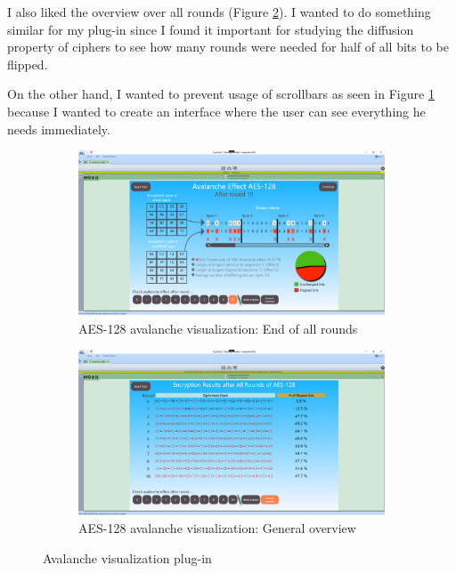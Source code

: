 I also liked the overview over all rounds (Figure \ref{fig:avalanche.overview}). I wanted to do something similar for my plug-in since I found it important for studying the diffusion property of ciphers to see how many rounds were needed for half of all bits to be flipped.

On the other hand, I wanted to prevent usage of scrollbars as seen in Figure \ref{fig:avalanche.roundsend} because I wanted to create an interface where the user can see everything he needs immediately.

\begin{figure}
\centering
\begin{subfigure}{\textwidth}
  \centering
  \includegraphics[width=\textwidth]{figures/ct2/avalanche.png}
  \caption{AES-128 avalanche visualization: End of all rounds}
  \label{fig:avalanche.roundsend}
\end{subfigure}
\begin{subfigure}{\textwidth}
  \centering
  \includegraphics[width=\textwidth]{figures/ct2/avalanche2.png}
  \caption{AES-128 avalanche visualization: General overview}
  \label{fig:avalanche.overview}
\end{subfigure}
\caption{Avalanche visualization plug-in}
\label{fig:avalanche}
\end{figure}